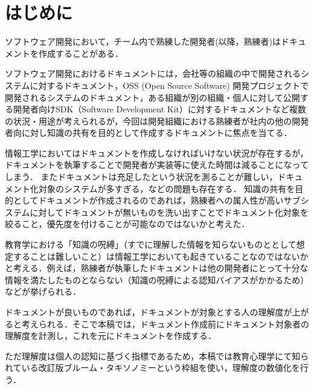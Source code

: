 \section{はじめに}
ソフトウェア開発において，チーム内で熟練した開発者(以降，熟練者)はドキュメントを作成することがある．\cite{bib:ozawa}

ソフトウェア開発におけるドキュメントには，会社等の組織の中で開発されるシステムに対するドキュメント，OSS (Open Source Software) 開発プロジェクトで開発されるシステムのドキュメント，ある組織が別の組織・個人に対して公開する開発者向けSDK（Software Development Kit）に対するドキュメントなど複数の状況・用途が考えられるが，今回は開発組織における熟練者が社内の他の開発者向に対し知識の共有を目的として作成するドキュメントに焦点を当てる．

情報工学においてはドキュメントを作成しなければいけない状況が存在するが，ドキュメントを執筆することで開発者が実装等に使えた時間は減ることになってしまう．
またドキュメントは充足したという状況を測ることが難しい，ドキュメント化対象のシステムが多すぎる，などの問題も存在する．
知識の共有を目的としてドキュメントが作成されるのであれば，熟練者への属人性が高いサブシステムに対してドキュメントが無いものを洗い出すことでドキュメント化対象を絞ること，優先度を付けることが可能なのではないかと考えた．

教育学における「知識の呪縛」（すでに理解した情報を知らないものととして想定することは難しいこと）\cite{bib:kaneda}は情報工学においても起きていることなのではないかと考える．例えば，熟練者が執筆したドキュメントは他の開発者にとって十分な情報を満たしたものとならない（知識の呪縛による認知バイアスがかかるため）などが挙げられる．

ドキュメントが良いものであれば，ドキュメントが対象とする人の理解度が上がると考えられる．そこで本稿では，ドキュメント作成前にドキュメント対象者の理解度を計測し，これを元にドキュメントを作成する．

ただ理解度は個人の認知に基づく指標であるため，本稿では教育心理学にて知られている改訂版ブルーム・タキソノミー\cite{bib:nakao}という枠組を使い，理解度の数値化を行う．
